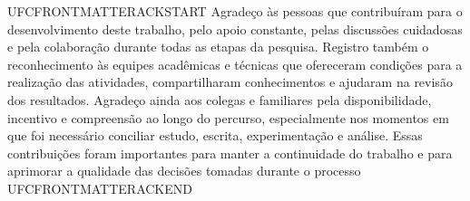 UFCFRONTMATTERACKSTART Agradeço às pessoas que contribuíram para o desenvolvimento deste trabalho, pelo apoio constante, pelas discussões cuidadosas e pela colaboração durante todas as etapas da pesquisa. Registro também o reconhecimento às equipes acadêmicas e técnicas que ofereceram condições para a realização das atividades, compartilharam conhecimentos e ajudaram na revisão dos resultados. Agradeço ainda aos colegas e familiares pela disponibilidade, incentivo e compreensão ao longo do percurso, especialmente nos momentos em que foi necessário conciliar estudo, escrita, experimentação e análise. Essas contribuições foram importantes para manter a continuidade do trabalho e para aprimorar a qualidade das decisões tomadas durante o processo UFCFRONTMATTERACKEND
